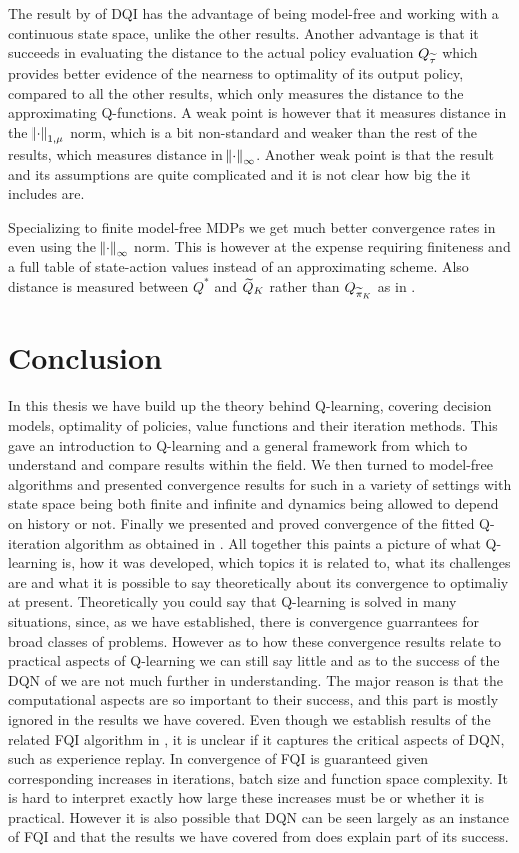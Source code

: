 The result by  of DQI has the advantage of being model-free
and working with a continuous state space, unlike the other results.
Another advantage is that it succeeds in evaluating the distance to the
actual policy evaluation $Q_{\widetilde{\tau}}$ which provides better evidence
of the nearness to optimality of its output policy, compared to all the
other results, which only measures the distance to the approximating
Q-functions.
A weak point is however that it measures distance in the $\norm{\cdot}_{1, \mu}$
norm, which is a bit non-standard and weaker than the rest of the results,
which measures distance in $\norm{\cdot}_\infty$.
Another weak point is that the result and its assumptions are
quite complicated and it is not clear how big the it includes
are.

Specializing to finite model-free MDPs we get much better convergence rates
in  even using the $\norm{\cdot}_\infty$ norm.
This is however at the expense requiring finiteness and
a full table of state-action values instead of an approximating scheme.
Also distance is measured between $Q^*$ and $\widetilde{Q}_K$ rather than
$Q_{\widetilde{\pi}_K}$ as in .

\section{Conclusion}

In this thesis we have build up the theory behind Q-learning,
covering decision models, optimality of policies,
value functions and their iteration methods.
This gave an introduction to Q-learning 
and a general framework from which to understand
and compare results within the field.
We then turned to model-free algorithms 
and presented convergence results for such in a variety
of settings with state space being both finite and infinite and
dynamics being allowed to depend on history or not.
Finally we presented and proved convergence of the fitted Q-iteration
algorithm as obtained in .
All together this paints a picture of what Q-learning is,
how it was developed, which topics it is related to,
what its challenges are and what it is possible to
say theoretically about its convergence to optimaliy at present.
Theoretically you could say that Q-learning is solved in many situations,
since, as we have established,
there is convergence guarrantees for broad classes of problems.
However as to how these convergence results relate to practical aspects of
Q-learning we can still say little and as to the success of the DQN of
 we are not much further in understanding.
The major reason is that the computational aspects are so important to their 
success, and this part is mostly ignored in the results we have covered.
Even though we establish results of the related FQI algorithm in ,
it is unclear if it captures the critical aspects of DQN,
such as experience replay.
In  convergence of FQI is guaranteed given corresponding
increases in iterations, batch size and function space complexity.
It is hard to interpret exactly how large these increases must be
or whether it is practical.
However it is also possible that DQN can be seen largely as an instance of FQI 
and that the results we have covered from  does explain
part of its success.

